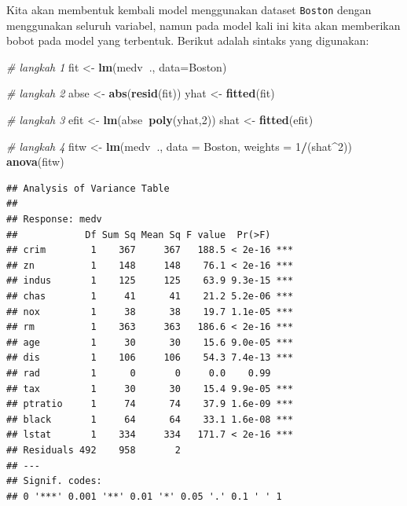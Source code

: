 \documentclass[]{book}
\newenvironment{Shaded}{\begin{snugshade}}{\end{snugshade}}
\newcommand{\CommentTok}[1]{\textcolor[rgb]{0.56,0.35,0.01}{\textit{#1}}}
\newcommand{\DataTypeTok}[1]{\textcolor[rgb]{0.13,0.29,0.53}{#1}}
\newcommand{\DecValTok}[1]{\textcolor[rgb]{0.00,0.00,0.81}{#1}}
\newcommand{\KeywordTok}[1]{\textcolor[rgb]{0.13,0.29,0.53}{\textbf{#1}}}
\newcommand{\NormalTok}[1]{#1}
\newcommand{\OperatorTok}[1]{\textcolor[rgb]{0.81,0.36,0.00}{\textbf{#1}}}
\newcommand{\StringTok}[1]{\textcolor[rgb]{0.31,0.60,0.02}{#1}}
\theoremstyle{definition}
\theoremstyle{definition}
\theoremstyle{definition}
\theoremstyle{remark}
\begin{document}
Kita akan membentuk kembali model menggunakan dataset \texttt{Boston} dengan menggunakan seluruh variabel, namun pada model kali ini kita akan memberikan bobot pada model yang terbentuk. Berikut adalah sintaks yang digunakan:

\begin{Shaded}
\begin{Highlighting}[]
\CommentTok{# langkah 1}
\NormalTok{fit <-}\StringTok{ }\KeywordTok{lm}\NormalTok{(medv}\OperatorTok{~}\NormalTok{., }\DataTypeTok{data=}\NormalTok{Boston)}

\CommentTok{# langkah 2}
\NormalTok{abse <-}\StringTok{ }\KeywordTok{abs}\NormalTok{(}\KeywordTok{resid}\NormalTok{(fit))}
\NormalTok{yhat <-}\StringTok{ }\KeywordTok{fitted}\NormalTok{(fit)}

\CommentTok{# langkah 3}
\NormalTok{efit <-}\StringTok{ }\KeywordTok{lm}\NormalTok{(abse}\OperatorTok{~}\KeywordTok{poly}\NormalTok{(yhat,}\DecValTok{2}\NormalTok{))}
\NormalTok{shat <-}\StringTok{ }\KeywordTok{fitted}\NormalTok{(efit)}

\CommentTok{# langkah 4}
\NormalTok{fitw <-}\StringTok{ }\KeywordTok{lm}\NormalTok{(medv}\OperatorTok{~}\NormalTok{., }\DataTypeTok{data =}\NormalTok{ Boston, }\DataTypeTok{weights =} \DecValTok{1}\OperatorTok{/}\NormalTok{(shat}\OperatorTok{^}\DecValTok{2}\NormalTok{))}
\KeywordTok{anova}\NormalTok{(fitw)}
\end{Highlighting}
\end{Shaded}

\begin{verbatim}
## Analysis of Variance Table
## 
## Response: medv
##            Df Sum Sq Mean Sq F value  Pr(>F)    
## crim        1    367     367   188.5 < 2e-16 ***
## zn          1    148     148    76.1 < 2e-16 ***
## indus       1    125     125    63.9 9.3e-15 ***
## chas        1     41      41    21.2 5.2e-06 ***
## nox         1     38      38    19.7 1.1e-05 ***
## rm          1    363     363   186.6 < 2e-16 ***
## age         1     30      30    15.6 9.0e-05 ***
## dis         1    106     106    54.3 7.4e-13 ***
## rad         1      0       0     0.0    0.99    
## tax         1     30      30    15.4 9.9e-05 ***
## ptratio     1     74      74    37.9 1.6e-09 ***
## black       1     64      64    33.1 1.6e-08 ***
## lstat       1    334     334   171.7 < 2e-16 ***
## Residuals 492    958       2                    
## ---
## Signif. codes:  
## 0 '***' 0.001 '**' 0.01 '*' 0.05 '.' 0.1 ' ' 1
\end{verbatim}
\end{document}
